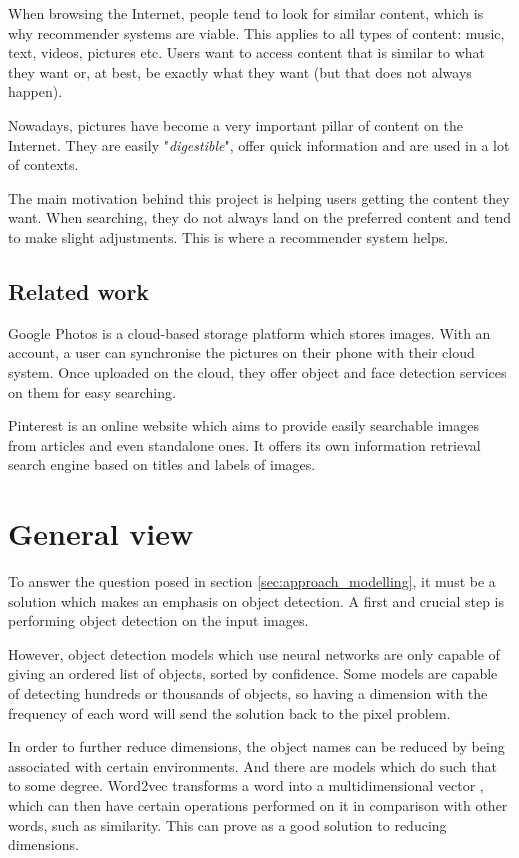 When browsing the Internet, people tend to look for similar content, which is why recommender systems are viable. This applies to all types of content: music, text, videos, pictures etc. Users want to access content that is similar to what they want or, at best, be exactly what they want (but that does not always happen).

Nowadays, pictures have become a very important pillar of content on the Internet. They are easily "\textit{digestible}", offer quick information and are used in a lot of contexts.

The main motivation behind this project is helping users getting the content they want. When searching, they do not always land on the preferred content and tend to make slight adjustments. This is where a recommender system helps.

\subsection{Related work}
\label{subsec:approach_related}

Google Photos is a cloud-based storage platform which stores images. With an account, a user can synchronise the pictures on their phone with their cloud system. Once uploaded on the cloud, they offer object and face detection services on them for easy searching. 

Pinterest is an online website which aims to provide easily searchable images from articles and even standalone ones. It offers its own information retrieval search engine based on titles and labels of images.

\section{General view}
\label{sec:approach_general}

To answer the question posed in section \ref{sec:approach_modelling}, it must be a solution which makes an emphasis on object detection. A first and crucial step is performing object detection on the input images.

However, object detection models which use neural networks are only capable of giving an ordered list of objects, sorted by confidence. Some models are capable of detecting hundreds or thousands of objects, so having a dimension with the frequency of each word will send the solution back to the pixel problem. 

In order to further reduce dimensions, the object names can be reduced by being associated with certain environments. And there are models which do such that to some degree. Word2vec transforms a word into a multidimensional vector \cite{word2vec}, which can then have certain operations performed on it in comparison with other words, such as similarity. This can prove as a good solution to reducing dimensions.

